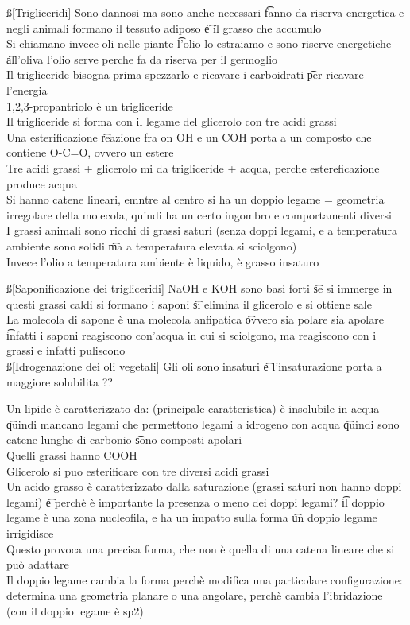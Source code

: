 \documentclass[12pt]{article}
\begin{document}
\ss[Trigliceridi]
Sono dannosi ma sono anche necessari \t fanno da riserva energetica e negli animali formano il tessuto adiposo \t è il grasso che accumulo \\
Si chiamano invece oli nelle piante \t l'olio lo estraiamo e sono riserve energetiche \t all'oliva l'olio serve perche fa da riserva per il germoglio \\
Il trigliceride bisogna prima spezzarlo e ricavare i carboidrati \t per ricavare l'energia \\
1,2,3-propantriolo è un trigliceride \\
Il trigliceride si forma con il legame del glicerolo con tre acidi grassi \\
Una esterificazione \t reazione fra on OH e un COH porta a un composto che contiene O-C=O, ovvero un estere \\
Tre acidi grassi + glicerolo mi da trigliceride + acqua, perche estereficazione produce acqua \\
Si hanno catene lineari, emntre al centro si ha un doppio legame = geometria irregolare della molecola, quindi ha un certo ingombro e comportamenti diversi \\
I grassi animali sono ricchi di grassi saturi (senza doppi legami, e a temperatura ambiente sono solidi \t ma a temperatura elevata si sciolgono) \\
Invece l'olio a temperatura ambiente è liquido, è grasso insaturo

\ss[Saponificazione dei trigliceridi]
NaOH e KOH sono basi forti \t se si immerge in questi grassi caldi si formano i saponi \t si elimina il glicerolo e si ottiene sale \\
La molecola di sapone è una molecola anfipatica \t ovvero sia polare sia apolare \t infatti i saponi reagiscono con'acqua in cui si sciolgono, ma reagiscono con i grassi e infatti puliscono \\

\ss[Idrogenazione dei oli vegetali]
Gli oli sono insaturi \t e l'insaturazione porta a maggiore solubilita ??

\s[Lipidi]
Un lipide è caratterizzato da: (principale caratteristica) è insolubile in acqua \t quindi mancano legami che permettono legami a idrogeno con acqua \t quindi sono catene lunghe di carbonio \t sono composti apolari \\
Quelli grassi hanno COOH \\
Glicerolo si puo esterificare con tre diversi acidi grassi \\
Un acido grasso è caratterizzato dalla saturazione (grassi saturi non hanno doppi legami) \t e perchè è importante la presenza o meno dei doppi legami? \t il doppio legame è una zona nucleofila, e ha un impatto sulla forma \t un doppio legame irrigidisce \\
Questo provoca una precisa forma, che non è quella di una catena lineare che si può adattare \\
Il doppio legame cambia la forma perchè modifica una particolare configurazione: determina una geometria planare o una angolare, perchè cambia l'ibridazione (con il doppio legame è sp2)
\end{document}
